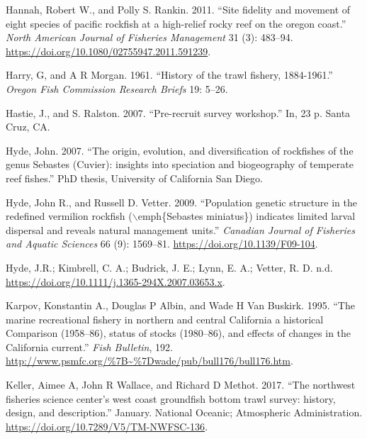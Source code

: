 \documentclass[
  english,
  a4paper,
]{article}
\newlength{\cslhangindent}
\newlength{\cslentryspacingunit} %
\newenvironment{CSLReferences}[2] %
 {%
  \setlength{\parindent}{0pt}
  \ifodd #1
  \let\oldpar\par
  \def\par{\hangindent=\cslhangindent\oldpar}
  \fi
  \setlength{\parskip}{#2\cslentryspacingunit}
 }%
 {}
\begin{document}
\begin{CSLReferences}{1}{0}
\leavevmode{}%
Hannah, Robert W., and Polly S. Rankin. 2011. {``{Site fidelity and movement of eight species of pacific rockfish at a high-relief rocky reef on the oregon coast}.''} \emph{North American Journal of Fisheries Management} 31 (3): 483--94. \url{https://doi.org/10.1080/02755947.2011.591239}.

\leavevmode{}%
Harry, G, and A R Morgan. 1961. {``{History of the trawl fishery, 1884-1961}.''} \emph{Oregon Fish Commission Research Briefs} 19: 5--26.

\leavevmode{}%
Hastie, J., and S. Ralston. 2007. {``{Pre-recruit survey workshop}.''} In, 23 p. Santa Cruz, CA.

\leavevmode{}%
Hyde, John. 2007. {``{The origin, evolution, and diversification of rockfishes of the genus Sebastes (Cuvier): insights into speciation and biogeography of temperate reef fishes}.''} PhD thesis, University of California San Diego.

\leavevmode{}%
Hyde, John R., and Russell D. Vetter. 2009. {``{Population genetic structure in the redefined vermilion rockfish (\(\backslash\)emph{\{}Sebastes miniatus{\}}) indicates limited larval dispersal and reveals natural management units}.''} \emph{Canadian Journal of Fisheries and Aquatic Sciences} 66 (9): 1569--81. \url{https://doi.org/10.1139/F09-104}.

\leavevmode{}%
Hyde, J.R.; Kimbrell, C. A.; Budrick, J. E.; Lynn, E. A.; Vetter, R. D. n.d. \url{https://doi.org/10.1111/j.1365-294X.2007.03653.x}.

\leavevmode{}%
Karpov, Konstantin A., Douglas P Albin, and Wade H Van Buskirk. 1995. {``{The marine recreational fishery in northern and central California a historical Comparison (1958--86), status of stocks (1980--86), and effects of changes in the California current}.''} \emph{Fish Bulletin}, 192. \url{http://www.psmfc.org/\%7B~\%7Dwade/pub/bull176/bull176.htm}.

\leavevmode{}%
Keller, Aimee A, John R Wallace, and Richard D Methot. 2017. {``{The northwest fisheries science center's west coast groundfish bottom trawl survey: history, design, and description}.''} January. National Oceanic; Atmospheric Administration. \url{https://doi.org/10.7289/V5/TM-NWFSC-136}.


\end{CSLReferences}
\end{document}
